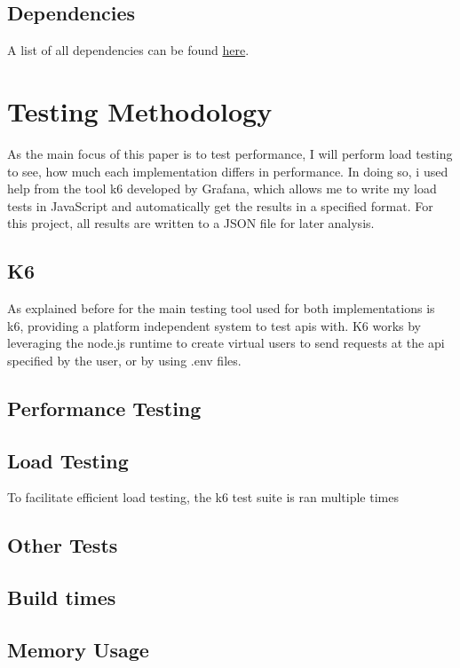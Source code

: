 \documentclass[a4paper,12pt]{article}
\begin{document}
	\subsection{Dependencies}
	A list of all dependencies can be found \href{https://github.com/casqan/actix-eval-mono}{here}.

	\section{Testing Methodology}
	\label{sec:testing_methodology}
	As the main focus of this paper is to test performance, I will perform load testing to see,
	how much each implementation differs in performance. In doing so, i used help from the tool
	k6 developed by Grafana, which allows me to write my load tests in JavaScript and automatically
	get the results in a specified format. For this project, all results are written to a JSON file
	for later analysis.

	\subsection{K6}
	\label{subsec:k6}
	As explained before for the main testing tool used for both implementations is k6, providing
	a platform independent system to test apis with. K6 works by leveraging the node.js runtime
	to create virtual users to send requests at the api specified by the user, or by using .env
	files.
	
	\subsection{Performance Testing}
	\label{subsec:performance_testing}

	\subsection{Load Testing}
	\label{subsec:load_testing}
	To facilitate efficient load testing, the k6 test suite is ran multiple times

	\subsection{Other Tests}
	\label{subsec:other_tests}
	\subsection*{Build times}
	\subsection*{Memory Usage}
\end{document}
